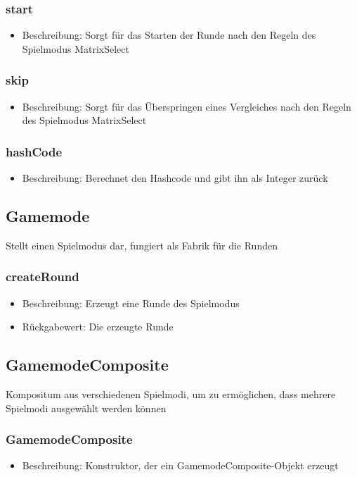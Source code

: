 \documentclass[a4paper]{scrreprt}
\begin{document}
	\subsubsection{start}
	\begin{itemize}
		\item Beschreibung: Sorgt für das Starten der Runde nach den Regeln des Spielmodus MatrixSelect
	\end{itemize}
	\subsubsection{skip}
	\begin{itemize}
		\item Beschreibung: Sorgt für das Überspringen eines Vergleiches nach den Regeln des Spielmodus MatrixSelect
	\end{itemize}
	\subsubsection{hashCode}
		\begin{itemize}
		\item Beschreibung: Berechnet den Hashcode und gibt ihn als Integer zurück
		\end{itemize}

	\subsection{Gamemode}
	Stellt einen Spielmodus dar, fungiert als Fabrik für die Runden
	\subsubsection{createRound}
	\begin{itemize}
		\item Beschreibung: Erzeugt eine Runde des Spielmodus
		\item Rückgabewert: Die erzeugte Runde
	\end{itemize}

	\subsection{GamemodeComposite}
	Kompositum aus verschiedenen Spielmodi, um zu ermöglichen, dass mehrere Spielmodi ausgewählt werden können
	\subsubsection{GamemodeComposite}
		\begin{itemize}
		\item Beschreibung: Konstruktor, der ein GamemodeComposite-Objekt erzeugt
		\end{itemize}
\end{document}
